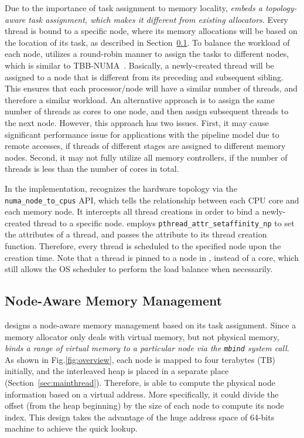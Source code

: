 Due to the importance of task assignment to  memory locality, \textit{\NA{} embeds a topology-aware task assignment, which makes it different from existing allocators}. Every thread is bound to a specific node, where its memory allocations will be based on the location of its task, as described in Section~\ref{sec:nodeaware-memory}. To balance the workload of each node, \NA{} utilizes a round-robin manner to assign the tasks to different nodes, which is similar to TBB-NUMA~\cite{Majo:2015:LPC:2688500.2688509}. Basically, a newly-created thread will be assigned to a node that is different from its preceding and subsequent sibling. This ensures that each processor/node will have a similar number of threads, and therefore a similar workload. An alternative approach is to assign the same number of threads as cores to one node, and then assign subsequent threads to the next node. However, this approach has two issues. First, it may cause significant performance issue for applications with the pipeline model due to remote accesses, if threads of different stages are assigned to different memory nodes. Second, it may not fully utilize all memory controllers, if the number of threads is less than the number of cores in total.    

In the implementation, \NA{} recognizes the hardware topology via the \texttt{numa\_node\_to\_cpus} API, which tells the relationship between each CPU core and each memory node. It intercepts all thread creations in order to bind a newly-created thread to a specific node. \NA{} employs \texttt{pthread\_attr\_setaffinity\_np} to set the attributes of a thread, and passes the attribute to its thread creation function. Therefore, every thread is scheduled to the specified node upon the creation time. Note that a thread is pinned to a node in \NM{}, instead of a core, which still allows the OS scheduler to perform the load balance when necessarily. 

\subsection{Node-Aware Memory Management} 
\label{sec:nodeaware-memory}

\NA{} designs a node-aware memory management based on its task assignment. Since a memory allocator only deals with virtual memory, but not physical memory, \textit{\NA{} binds a range of virtual memory to a particular node via the \texttt{mbind} system call}. As shown in Fig.\ref{fig:overview}, each node is mapped to four terabytes (TB) initially, and the interleaved heap is placed in a separate place (Section~\ref{sec:mainthread}).  Therefore, \NA{} is able to compute the physical node information based on a virtual address. More specifically, it could divide the offset (from the heap beginning) by the size of each node to compute its node index. This design takes the advantage of the huge address space of 64-bits machine to achieve the quick lookup.

